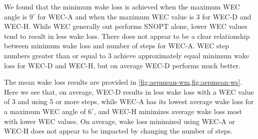 \documentclass[a4paper]{jpconf}
\begin{document}
%
We found that the minimum wake loss is achieved when the maximum WEC angle is $9^\circ$ for WEC-A and when the maximum WEC value is 3 for WEC-D and WEC-H. While WEC generally out performs SNOPT alone, lower WEC values tend to result in less wake loss. There does not appear to be a clear relationship between minimum wake loss and number of steps for WEC-A. WEC step numbers greater than or equal to 3 achieve approximately equal minimum wake loss for WEC-D and WEC-H, but on average WEC-D performs much better.

The mean wake loss results are provided in \cref{fig:aepmean-wm,fig:aepmean-ws}. Here we see that, on average, WEC-D results in less wake loss with a WEC value of 3 and using 5 or more steps, while WEC-A has its lowest average wake loss for a maximum WEC angle of $6^\circ$, and WEC-H minimizes average wake loss most with lower WEC values. On average, wake loss minimized using WEC-A or WEC-H does not appear to be impacted by changing the number of steps.
\end{document}
